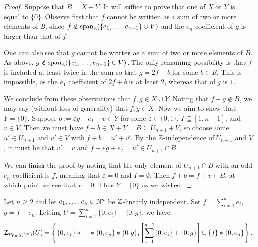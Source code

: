 \begin{proof}
	Suppose that $B = X + Y$.
	It will suffice to prove that one of $X$ or $Y$ is equal to $\{0\}$.
	Observe first that $f$ cannot be written as a sum of two or more elements of $B$, since $f\notin \operatorname{span}_{\mathbb{Z}} (\{e_1,\dots, e_{n-1}\}\cup V)$ and the $e_n$ coefficient of $g$ is larger than that of $f$.
	
	One can also see that $g$ cannot be written as a sum of two or more elements of $B$.
	As above, $g\notin \operatorname{span}_{\mathbb{Z}} (\{e_1,\dots, e_{n-1}\}\cup V)$.
	The only remaining possibility is that $f$ is included at least twice in the sum so that $g = 2f + b$ for some $b\in B$.
	This is impossible, as the $e_1$ coefficient of $2f+b$ is at least $2$, whereas that of $g$ is $1$.
	
	We conclude from these observations that $f,g\in X \cup Y$.
	Noting that $f+g \notin B$, we may say (without loss of generality) that $f,g\in X$.
	Now we aim to show that $Y = \{0\}$.
	Suppose $b := \varepsilon g + e_I +v \in Y$ for some $\varepsilon \in \{0,1\}$, $I\subseteq [ 1,n-1]$, and $v\in V$.
	Then we must have $f + b \in X+Y = B \subseteq U_{n+1} + V$, so choose some $u'\in U_{n+1}$ and $v'\in V$ with $f + b = u' + v'$.
	By the $\mathbb{Z}$-independence of $U_{n+1}$ and $V$, it must be that $v' = v$ and $f + \varepsilon g + e_I = u' \in U_{n+1} \cap B$.
	
	We can finish the proof by noting that the only element of $U_{n+1}\cap B$ with an odd $e_n$ coefficient is $f$, meaning that $\varepsilon=0$ and $I = \emptyset$.
	Then $f+b = f+v \in B$, at which point we see that $v = 0$.
	Thus $Y = \{0\}$ as we wished.
\end{proof}

\begin{thm} \label{thm:2n-length-set}
	Let $n\ge 2$ and let $e_1,\dots, e_n\in \mathbb{N}^n$ be $\mathbb{Z}$-linearly independent.
	Set $f = \sum_{i=1}^n e_i$, $g=f+e_n$.
	Letting $U = \sum_{i=1}^n \{0,e_i\} + \{0,g\}$, we have 
	\[\mathsf{Z}_{\mathcal{P}_{\textrm{fin}, 0}(\mathbb{N}^n)}(U) = \left\{ \{0,e_1\}*\cdots*\{0,e_n\}*\{0,g\}, \left[\sum_{i=1}^{n-1}\{0,e_i\}+\{0,g\}\right]\cup\{f\} * \{0,e_n\} \right\}. \]
\end{thm}

